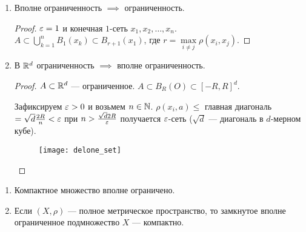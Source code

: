 \begin{properties}
    \begin{enumerate}
        \item Вполне ограниченность $\implies$ ограниченность.
             \begin{proof}
                $\varepsilon = 1$ и конечная  $1$-сеть  $x_1, x_2,\ldots,x_n$. $A \subset \bigcup\limits_{k=1}^n B_1(x_k) \subset B_{r+1}(x_1)$, где $r = \max\limits_{i \neq j} \rho(x_i, x_j)$.
            \end{proof}
        \item В $\mathbb{R}^d$ ограниченность  $\implies$ вполне ограниченность. 
             \begin{proof}
                $A \subset \mathbb{R}^d$ --- ограниченное.  $A \subset B_R(O) \subset [-R, R]^d$.

                Зафиксируем $\varepsilon > 0$ и возьмем  $n \in \mathbb{N}$.  $\rho(x_i, a) \le$ главная диагональ $=\sqrt{d}\frac{2R}{n} < \varepsilon$ при $n > \frac{\sqrt{d} 2R}{\varepsilon}$ получается $\varepsilon$-сеть ($\sqrt{d}$ --- диагональ в $d$-мерном кубе).
                \begin{figure}[h!]
                    \texttt{[image: delone\_set]}
                \end{figure}
            \end{proof}
    \end{enumerate}
\end{properties}
\begin{theorem}[Хаусдорфа]
    \begin{enumerate}
        \item Компактное множество вполне ограничено.
        \item Если $(X, \rho)$ --- полное метрическое пространство, то замкнутое вполне ограниченное подмножество  $X$ --- компактно.
    \end{enumerate}
\end{theorem}
